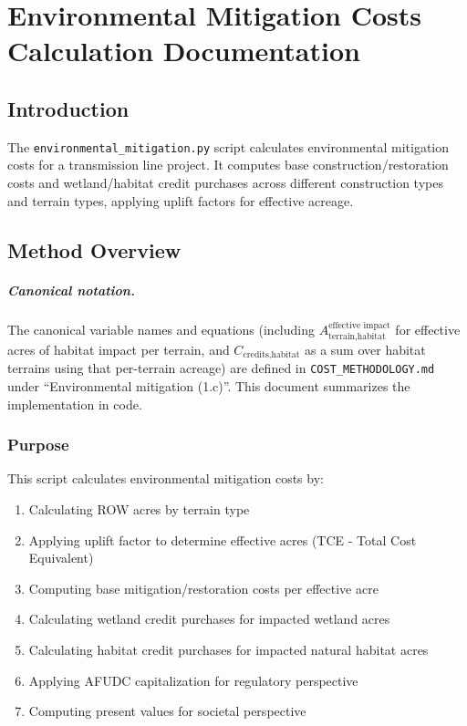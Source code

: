 \documentclass[ctcc_full_documentation.tex]{subfiles}
\begin{document}
\chapter{Environmental Mitigation Costs Calculation Documentation}

\section{Introduction}

The \texttt{environmental\_mitigation.py} script calculates environmental mitigation costs for a transmission line project. It computes base construction/restoration costs and wetland/habitat credit purchases across different construction types and terrain types, applying uplift factors for effective acreage.

\section{Method Overview}

\paragraph{Canonical notation.}
The canonical variable names and equations (including $A^{\text{effective impact}}_{\text{terrain,habitat}}$ for effective acres of habitat impact per terrain, and $C_{\text{credits,habitat}}$ as a sum over habitat terrains using that per-terrain acreage) are defined in \texttt{COST\_METHODOLOGY.md} under ``Environmental mitigation (1.c)''. This document summarizes the implementation in code.

\subsection{Purpose}

This script calculates environmental mitigation costs by:
\begin{enumerate}
    \item Calculating ROW acres by terrain type
    \item Applying uplift factor to determine effective acres (TCE - Total Cost Equivalent)
    \item Computing base mitigation/restoration costs per effective acre
    \item Calculating wetland credit purchases for impacted wetland acres
    \item Calculating habitat credit purchases for impacted natural habitat acres
    \item Applying AFUDC capitalization for regulatory perspective
    \item Computing present values for societal perspective
\end{enumerate}
\end{document}
